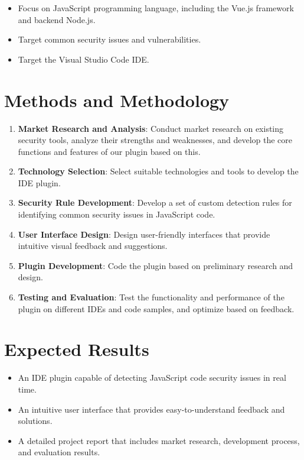 \documentclass{article}
\begin{document}
\begin{itemize}
    \item Focus on JavaScript programming language, including the Vue.js framework and backend Node.js.
    \item Target common security issues and vulnerabilities.
    \item Target the Visual Studio Code IDE.
\end{itemize}

\section{Methods and Methodology}

\begin{enumerate}
    \item \textbf{Market Research and Analysis}: Conduct market research on existing security tools, analyze their strengths and weaknesses, and develop the core functions and features of our plugin based on this.
    \item \textbf{Technology Selection}: Select suitable technologies and tools to develop the IDE plugin.
    \item \textbf{Security Rule Development}: Develop a set of custom detection rules for identifying common security issues in JavaScript code.
    \item \textbf{User Interface Design}: Design user-friendly interfaces that provide intuitive visual feedback and suggestions.
    \item \textbf{Plugin Development}: Code the plugin based on preliminary research and design.
    \item \textbf{Testing and Evaluation}: Test the functionality and performance of the plugin on different IDEs and code samples, and optimize based on feedback.
\end{enumerate}

\section{Expected Results}

\begin{itemize}
    \item An IDE plugin capable of detecting JavaScript code security issues in real time.
    \item An intuitive user interface that provides easy-to-understand feedback and solutions.
    \item A detailed project report that includes market research, development process, and evaluation results.
\end{itemize}
\end{document}
